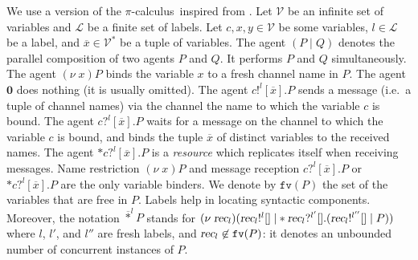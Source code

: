 \documentclass{article}
\newcommand{\picalcul}{$\pi$-calculus}
\newcommand{\Names}{\mathcal{V}}
\newcommand{\Labels}{\mathcal{L}}
\newcommand{\concu}{|}
\newcommand{\nuu}{\nu\;}
\newcommand{\repli}{\ast}
\newcommand{\rec}{?}
\newcommand{\eme}{!}
\newcommand{\emptypro}{\mathbf{0}}
\newcommand{\bang}[1]{\overline{\repli}^{#1}}
\newcommand{\recur}[1]{{\textsl{#1}}}
\newcommand{\cbang}{\recur{rec}}
\newcommand{\FN}{\texttt{fv}}
\begin{document}
We use  a version of the \picalcul\  inspired from
\cite{milner:polyadic,turner:thesis,cham}.
Let $\Names$ be  an infinite set of variables and $\Labels$ be a finite set of labels. 
Let $c,x,y\in \Names$ be some variables, $l\in\Labels$ be a label, 
and $\overline{x}\in \Names^{\ast}$ be a tuple of variables.
The agent $(P\;\concu\; Q)$ denotes the parallel composition of two agents $P$ and $Q$. It performs $P$ and $Q$ simultaneously. 
The agent $(\nuu x)P$ binds the variable $x$ to a fresh channel name in $P$.
The agent $\emptypro$ does nothing (it is usually omitted).
The agent $c\eme^l[\overline{x}].P$  sends a message (i.e.~a tuple of channel names) via the channel the name to which the variable $c$ is bound. 
The agent $c\rec^l[\overline{x}].P$ waits for a message on the channel  to which the variable $c$ is bound, and binds the tuple $\overline{x}$ of distinct variables to the received  names. The agent $\repli c\rec^l[\overline{x}].P$ is a \emph{resource} which replicates itself when  receiving messages.
Name restriction $(\nuu x)P$ and message reception $c\rec^l[\overline{x}].P$ or $\repli c\rec^l[\overline{x}].P$ are the only variable binders.
We denote by $\FN(P)$ the set of the variables that are free in $P$. 
Labels help in locating syntactic components. 
Moreover, the notation $\bang{l} P$ stands for $(\nuu\cbang_l)(\cbang_l\eme^{l}[] \;\concu \repli\cbang_l\rec^{l'}[].(\cbang_l\eme^{l''}[]  \;|\;P))$ where $l$, $l'$, and $l''$ are fresh labels, and $\cbang_l \not\in\FN(P)$: it denotes an unbounded number of concurrent instances of $P$.
\end{document}
